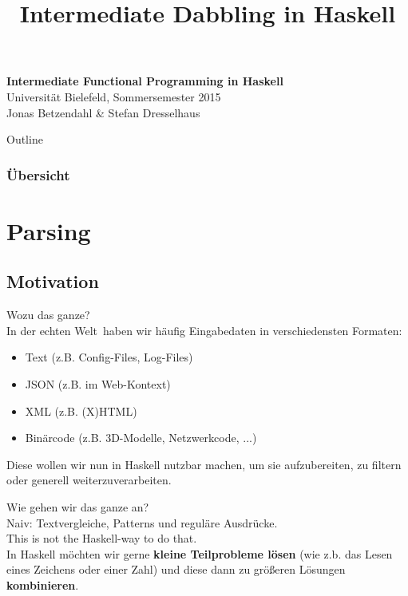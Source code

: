 \documentclass{beamer}
\title{Intermediate Dabbling in Haskell}
\begin{document}
  

  \begin{frame}
  \begin{center}
    \Huge\textbf{Intermediate Functional Programming in Haskell}\\ \bigskip
    \LARGE Universität Bielefeld, Sommersemester 2015\\ \bigskip
    \large Jonas Betzendahl \& Stefan Dresselhaus
    \end{center}
  \end{frame}

\begin{frame}[allowframebreaks]{Outline}
\frametitle{Übersicht}
\tableofcontents[hideallsubsections]
\end{frame}

\section{Parsing}

\subsection{Motivation}

\begin{frame}[fragile]
\large Wozu das ganze?\\
\normalsize In der \glqq echten Welt\grqq \ haben wir häufig Eingabedaten in verschiedensten Formaten:
\begin{itemize}
 \item Text (z.B. Config-Files, Log-Files)
 \item JSON (z.B. im Web-Kontext)
 \item XML (z.B. (X)HTML)
 \item Binärcode (z.B. 3D-Modelle, Netzwerkcode, ...)
\end{itemize}
\pause
Diese wollen wir nun in Haskell nutzbar machen, um sie aufzubereiten, zu filtern oder generell weiterzuverarbeiten.
\end{frame}

\begin{frame}[fragile]
\large Wie gehen wir das ganze an?\\
\normalsize Naiv: Textvergleiche, Patterns und reguläre Ausdrücke.\\
\bigskip
\pause
This is not the Haskell-way to do that.\\
\bigskip
\pause
In Haskell möchten wir gerne \textbf{kleine Teilprobleme lösen} (wie z.b. das Lesen eines Zeichens oder einer Zahl) und diese dann zu größeren Lösungen \textbf{kombinieren}.
\end{frame}
\end{document}
